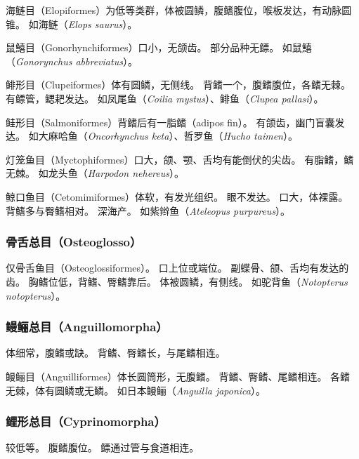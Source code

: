 \documentclass[11pt]{article}
\begin{document}
\newline

海鲢目（Elopiformes）为低等类群，体被圆鳞，腹鳍腹位，喉板发达，有动脉圆锥。
如海鲢（\textit{Elops saurus}）。

\newline

鼠鱚目（Gonorhynchiformes）口小，无颌齿。
部分品种无鳔。
如鼠鱚（\textit{Gonorynchus abbreviatus}）。

\newline

鲱形目（Clupeiformes）体有圆鳞，无侧线。
背鳍一个，腹鳍腹位，各鳍无棘。
有鳔管，鳃耙发达。
如凤尾鱼（\textit{Coilia mystus}）、鲱鱼（\textit{Clupea pallasi}）。

\newline

鲑形目（Salmoniformes）背鳍后有一脂鳍（adipos fin）。
有颌齿，幽门盲囊发达。
如大麻哈鱼（\textit{Oncorhynchus keta}）、哲罗鱼（\textit{Hucho taimen}）。

\newline

灯笼鱼目（Myctophiformes）口大，颌、颚、舌均有能倒伏的尖齿。
有脂鳍，鳍无棘。
如龙头鱼（\textit{Harpodon nehereus}）。

\newline

鲸口鱼目（Cetomimiformes）体软，有发光组织。
眼不发达。
口大，体裸露。
背鳍多与臀鳍相对。
深海产。
如紫辫鱼（\textit{Ateleopus purpureus}）。

\subsubsection{骨舌总目（Osteoglosso）}
仅骨舌鱼目（Osteoglossiformes）。
口上位或端位。
副蝶骨、颌、舌均有发达的齿。
胸鳍位低，背鳍、臀鳍靠后。
体被圆鳞，有侧线。
如驼背鱼（\textit{Notopterus notopterus}）。

\subsubsection{鳗鲡总目（Anguillomorpha）}
体细常，腹鳍或缺。
背鳍、臀鳍长，与尾鳍相连。

\newline

鳗鲡目（Anguilliformes）体长圆筒形，无腹鳍。
背鳍、臀鳍、尾鳍相连。
各鳍无棘，体有圆鳞或无鳞。
如日本鳗鲡（\textit{Anguilla japonica}）。

\subsubsection{鲤形总目（Cyprinomorpha）}
较低等。
腹鳍腹位。
鳔通过管与食道相连。
\end{document}
